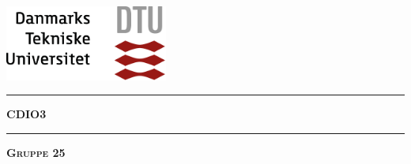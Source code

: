 
\begin{titlepage}
\begin{center}
\vspace{2cm}
\includegraphics[width=0.4\textwidth]{root/dtu.png}~\\[1cm]
\vspace{2cm}

\vspace{1.5cm}

\hrule
\vspace{.5cm}
{ \huge \bfseries CDIO3} %
\vspace{.5cm}

\hrule
\vspace{1.5cm}

\textsc{\textbf{Gruppe 25}}\\
\vspace{.5cm}
\centering


\end{center}
\end{titlepage}
